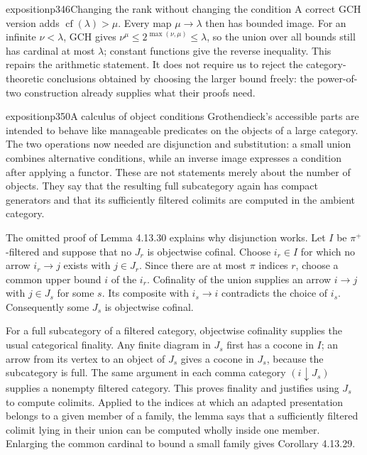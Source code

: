 \begin{dcomment}{exposition}{p346}{Changing the rank without changing the condition}
A correct GCH version adds $\operatorname{cf}(\lambda)>\mu$. Every map $\mu\to\lambda$ then has bounded image. For an infinite $\nu<\lambda$, GCH gives $\nu^\mu\leq 2^{\max(\nu,\mu)}\leq\lambda$, so the union over all bounds still has cardinal at most $\lambda$; constant functions give the reverse inequality. This repairs the arithmetic statement. It does not require us to reject the category-theoretic conclusions obtained by choosing the larger bound freely: the power-of-two construction already supplies what their proofs need.
\end{dcomment}

\begin{dcomment}{exposition}{p350}{A calculus of object conditions}
Grothendieck's accessible parts are intended to behave like manageable predicates on the objects of a large category. The two operations now needed are disjunction and substitution: a small union combines alternative conditions, while an inverse image expresses a condition after applying a functor. These are not statements merely about the number of objects. They say that the resulting full subcategory again has compact generators and that its sufficiently filtered colimits are computed in the ambient category.

The omitted proof of Lemma 4.13.30 explains why disjunction works. Let $I$ be $\pi^+$-filtered and suppose that no $J_r$ is objectwise cofinal. Choose $i_r\in I$ for which no arrow $i_r\to j$ exists with $j\in J_r$. Since there are at most $\pi$ indices $r$, choose a common upper bound $i$ of the $i_r$. Cofinality of the union supplies an arrow $i\to j$ with $j\in J_s$ for some $s$. Its composite with $i_s\to i$ contradicts the choice of $i_s$. Consequently some $J_s$ is objectwise cofinal.

For a full subcategory of a filtered category, objectwise cofinality supplies the usual categorical finality. Any finite diagram in $J_s$ first has a cocone in $I$; an arrow from its vertex to an object of $J_s$ gives a cocone in $J_s$, because the subcategory is full. The same argument in each comma category $(i\downarrow J_s)$ supplies a nonempty filtered category. This proves finality and justifies using $J_s$ to compute colimits. Applied to the indices at which an adapted presentation belongs to a given member of a family, the lemma says that a sufficiently filtered colimit lying in their union can be computed wholly inside one member. Enlarging the common cardinal to bound a small family gives Corollary 4.13.29.


\end{dcomment}
